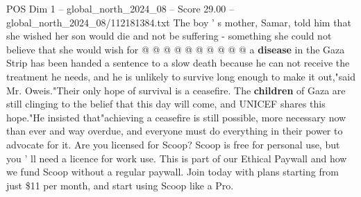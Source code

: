 \begin{textsample}{POS Dim 1 – global\_north\_2024\_08 – Score 29.00 – global\_north\_2024\_08/112181384.txt}
The boy ' s mother, Samar, told him that she wished her son would die and not be suffering - something she could not believe that she would wish for @ @ @ @ @ @ @ @ @ @ a \textbf{disease} in the Gaza Strip has been handed a sentence to a slow death because he can not receive the treatment he needs, and he is unlikely to survive long enough to make it out,"said Mr.
Oweis."Their only hope of survival is a ceasefire.
The \textbf{children} of Gaza are still clinging to the belief that this day will come, and UNICEF shares this hope."He insisted that"achieving a ceasefire is still possible, more necessary now than ever and way overdue, and everyone must do everything in their power to advocate for it.
Are you licensed for Scoop?
Scoop is free for personal use, but you ' ll need a licence for work use.
This is part of our Ethical Paywall and how we fund Scoop without a regular paywall.
Join today with plans starting from just \$11 per month, and start using Scoop like a Pro.

\end{textsample}
